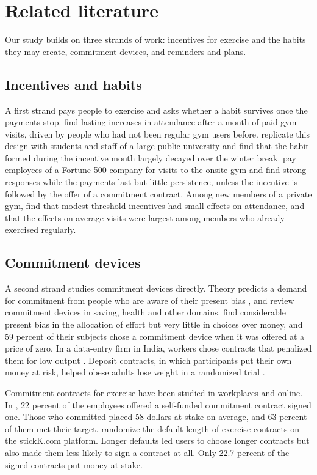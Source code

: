 \section{Related literature}
\label{sec:literature}
Our study builds on three strands of work: incentives for exercise and the habits they may create, commitment devices, and reminders and plans.

\subsection{Incentives and habits}
A first strand pays people to exercise and asks whether a habit survives once the payments stop. \citet{charness2009} find lasting increases in attendance after a month of paid gym visits, driven by people who had not been regular gym users before. \citet{acland2015} replicate this design with students and staff of a large public university and find that the habit formed during the incentive month largely decayed over the winter break. \citet{royer2015} pay employees of a Fortune 500 company for visits to the onsite gym and find strong responses while the payments last but little persistence, unless the incentive is followed by the offer of a commitment contract. Among new members of a private gym, \citet{carrera2018incentives} find that modest threshold incentives had small effects on attendance, and that the effects on average visits were largest among members who already exercised regularly.

\subsection{Commitment devices}
A second strand studies commitment devices directly. Theory predicts a demand for commitment from people who are aware of their present bias \citep{odonoghue1999}, and \citet{bryan2010} review commitment devices in saving, health and other domains. \citet{augenblick2015} find considerable present bias in the allocation of effort but very little in choices over money, and 59 percent of their subjects chose a commitment device when it was offered at a price of zero. In a data-entry firm in India, workers chose contracts that penalized them for low output \citep{kaur2015}. Deposit contracts, in which participants put their own money at risk, helped obese adults lose weight in a randomized trial \citep{volpp2008}.

Commitment contracts for exercise have been studied in workplaces and online. In \citet{royer2015}, 22 percent of the employees offered a self-funded commitment contract signed one. Those who committed placed 58 dollars at stake on average, and 63 percent of them met their target. \citet{bhattacharya2015} randomize the default length of exercise contracts on the stickK.com platform. Longer defaults led users to choose longer contracts but also made them less likely to sign a contract at all. Only 22.7 percent of the signed contracts put money at stake.


